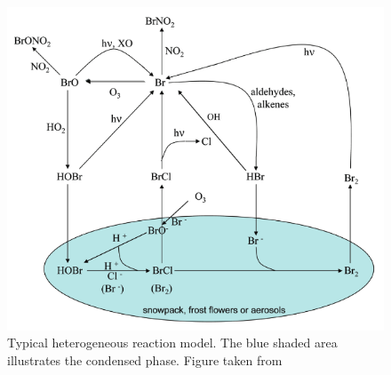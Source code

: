 \begin{figure}
    \centering
    \includegraphics[width=0.7\linewidth]{Chapter2_Theory/images/ODE_Finlayson-Pitts.png}
    \caption{Typical heterogeneous reaction model. The blue shaded area illustrates the condensed phase. Figure taken from \cite{FinlaysonPitts2010}}
    \label{fig:het_react}
\end{figure}
